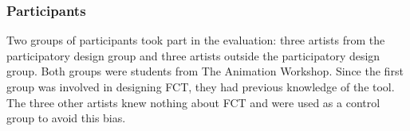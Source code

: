 \subsubsection{Participants}
Two groups of participants took part in the evaluation: three artists from the participatory design group and three artists outside the participatory design group. Both groups were students from The Animation Workshop. Since the first group was involved in designing FCT, they had previous knowledge of the tool. The three other artists knew nothing about FCT and were used as a control group to avoid this bias.